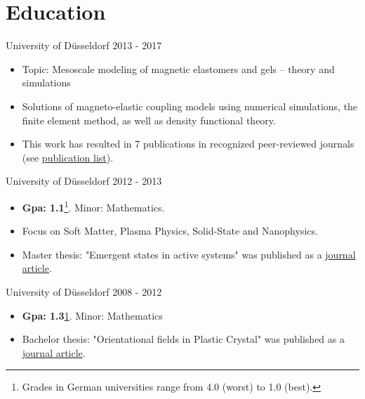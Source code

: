 \documentclass[singlesided,
               paper=a4,
               fontsize=10pt
              ]{my-resume}
\begin{document}
\section[\faMortarBoard]{Education}
    {University of Düsseldorf}
    {2013 - 2017}
    {
        \begin{itemize}
            \item Topic: Mesoscale modeling of magnetic elastomers and gels -- theory and simulations
            \item Solutions of magneto-elastic coupling models using numerical simulations, the finite element method, as well as density functional theory. 
            \item This work has resulted in 7 publications in recognized peer-reviewed journals (see \href{https://scholar.google.com/citations?hl=de&user=MnU8ZxwAAAAJ}{publication list}).
        \end{itemize}
    }
    {University of Düsseldorf}
    {2012 - 2013}
    {
        \begin{itemize}
            \item \textbf{Gpa: 1.1}\footnote{\label{footnote1}Grades in German universities range from 4.0 (worst) to 1.0 (best).}. Minor: Mathematics.
            \item Focus on Soft Matter, Plasma Physics, Solid-State and Nanophysics.
            \item Master thesis: "Emergent states in active systems" was published as a \href{https://journals.aps.org/pre/abstract/10.1103/PhysRevE.89.022307}{journal article}.
        \end{itemize}
    }
    {University of Düsseldorf}
    {2008 - 2012}
    {
        \begin{itemize}
            \item \textbf{Gpa: 1.3}\cref{footnote1}. Minor: Mathematics
            \item Bachelor thesis: "Orientational fields in Plastic Crystal" was published as a \href{https://epljournal.edpsciences.org/articles/epl/abs/2012/15/epl14756/epl14756.html}{journal article}.
        \end{itemize}
    }
\end{document}
